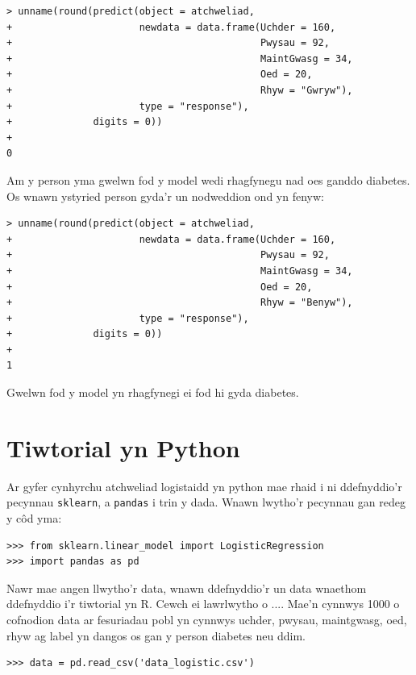 \begin{verbatim}
> unname(round(predict(object = atchweliad, 
+                      newdata = data.frame(Uchder = 160,
+                                           Pwysau = 92, 
+                                           MaintGwasg = 34, 
+                                           Oed = 20, 
+                                           Rhyw = "Gwryw"), 
+                      type = "response"),
+              digits = 0))
+ 
0
\end{verbatim}

Am y person yma gwelwn fod y model wedi rhagfynegu nad oes ganddo diabetes. Os wnawn ystyried person gyda'r un nodweddion ond yn fenyw:

\begin{verbatim}
> unname(round(predict(object = atchweliad,
+                      newdata = data.frame(Uchder = 160,
+                                           Pwysau = 92, 
+                                           MaintGwasg = 34, 
+                                           Oed = 20, 
+                                           Rhyw = "Benyw"), 
+                      type = "response"),
+              digits = 0))
+ 
1
\end{verbatim}

Gwelwn fod y model yn rhagfynegi ei fod hi gyda diabetes.

\section{Tiwtorial yn Python}

Ar gyfer cynhyrchu atchweliad logistaidd yn python mae rhaid i ni ddefnyddio'r pecynnau \texttt{sklearn}, a \texttt{pandas} i trin y dada. Wnawn lwytho'r pecynnau gan redeg y c\^{o}d yma:

\begin{verbatim}
>>> from sklearn.linear_model import LogisticRegression
>>> import pandas as pd
\end{verbatim}

Nawr mae angen llwytho'r data, wnawn ddefnyddio'r un data wnaethom ddefnyddio i'r tiwtorial yn R. Cewch ei lawrlwytho o .... Mae'n cynnwys 1000 o cofnodion data ar fesuriadau pobl yn cynnwys uchder, pwysau, maintgwasg, oed, rhyw ag label yn dangos os gan y person diabetes neu ddim.  

\begin{verbatim}
>>> data = pd.read_csv('data_logistic.csv')
\end{verbatim}

